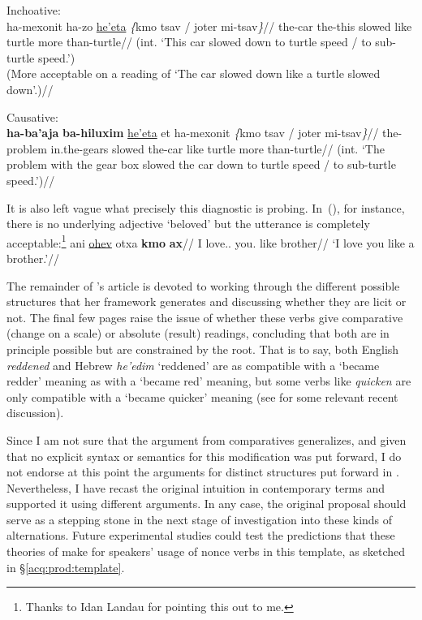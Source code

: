 	\a Inchoative:\\ \begingl
		\gla\ljudge{*}ha-mexonit ha-zo \underline{he'eta} \emph{\{}kmo tsav / joter mi-tsav\emph{\}}//
		\glb the-car the-this slowed like turtle {} more than-turtle//
		\glft (int. `This car slowed down to turtle speed / to sub-turtle speed.')\\
			(More acceptable on a reading of `The car slowed down like a turtle slowed down'.)//
	\endgl

	\a Causative:\\ \begingl
		\gla{}\textbf{ha-ba'aja} \textbf{ba-hiluxim} \underline{he'eta} et ha-mexonit \emph{\{}kmo tsav / joter mi-tsav\emph{\}}//
		\glb the-problem in.the-gears slowed  the-car like turtle {} more than-turtle//
		\glft (int. `The problem with the gear box slowed the car down to turtle speed / to sub-turtle speed.')//
	\endgl
\xe

It is also left vague what precisely this diagnostic is probing. In~(\nextx), for instance, there is no underlying adjective `beloved' but the utterance is completely acceptable:\footnote{Thanks to Idan Landau for pointing this out to me.}
\ex
	\begingl
	\gla ani \underline{ohev} otxa \textbf{kmo} \textbf{ax}//
	\glb I love.. you. like brother//
	\glft `I love you like a brother.'//
	\endgl
\xe

The remainder of \citeauthor{borer91}'s article is devoted to working through the different possible structures that her framework generates and discussing whether they are licit or not. The final few pages \citep[150]{borer91} raise the issue of whether these verbs give comparative (change on a scale) or absolute (result) readings, concluding that both are in principle possible but are constrained by the root. That is to say, both English \emph{reddened} and Hebrew \emph{he'edim} `reddened' are as compatible with a `became redder' meaning as with a `became red' meaning, but some verbs like \emph{quicken} are only compatible with a `became quicker' meaning (see \citealt[ch.~5]{bobaljik12} for some relevant recent discussion).

Since I am not sure that the argument from comparatives generalizes, and given that no explicit syntax or semantics for this modification was put forward, I do not endorse at this point the arguments for distinct structures put forward in \cite{borer91}. Nevertheless, I have recast the original intuition in contemporary terms and supported it using different arguments. In any case, the original proposal should serve as a stepping stone in the next stage of investigation into these kinds of alternations. Future experimental studies could test the predictions that these theories of {\thif} make for speakers' usage of nonce verbs in this template, as sketched in \S\ref{acq:prod:template}.


